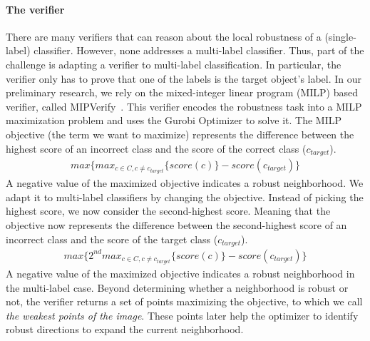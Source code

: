     \paragraph{The verifier}
    There are many verifiers that can reason about the local robustness of a (single-label) classifier.
    However, none addresses a multi-label classifier.
    Thus, part of the challenge is adapting a verifier to multi-label classification.
    In particular, the verifier only has to prove that one of the labels is the target object's label. %
    In our preliminary research, we rely on the mixed-integer linear program (MILP) based verifier, called MIPVerify~\cite{MIPVERIFY}.
    This verifier encodes the robustness task into a MILP maximization problem and uses the Gurobi Optimizer to solve it.
    The MILP objective (the term we want to maximize) represents the difference between the highest score of an incorrect class and the score of the correct class ($c_{target}$).
    \begin{gather*}
        max\{max_{c \in C, c \neq c_{target}}\{score(c)\} - score(c_{target})\}
    \end{gather*}
    A negative value of the maximized objective indicates a robust neighborhood.
    We adapt it to multi-label classifiers by changing the objective.
    Instead of picking the highest score, we now consider the second-highest score.
    Meaning that the objective now represents the difference between the second-highest score of an incorrect class and the score of the target class ($c_{target}$).
    \begin{gather*}
        max\{2^{nd}max_{c \in C, c \neq c_{target}}\{score(c)\} - score(c_{target})\}
    \end{gather*}
    A negative value of the maximized objective indicates a robust neighborhood in the multi-label case.
    Beyond determining whether a neighborhood is robust or not, the verifier returns a set of points maximizing the objective, to which we call \emph{the weakest points of the image}.
    These points later help the optimizer to identify robust directions to expand the current neighborhood.
    
